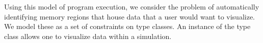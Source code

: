 
Using this model of program execution, we consider the problem of
automatically identifying memory regions that house data that a user
would want to visualize.  We model these as a set of constraints on
type classes.  An instance of the type class allows one to visualize
data within a simulation.

